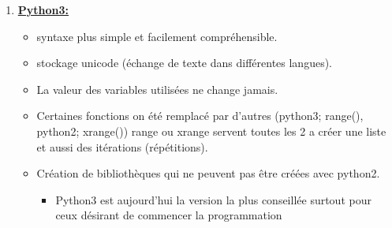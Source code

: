 \documentclass[a4paper, 12pt]{article}
\numberwithin{equation}{subsection}
\begin{document}
\begin{enumerate}
\begin{enumerate}
\begin{itemize}
              \end{itemize}
        \item \underline{{\bf Python3:}}
              \begin{itemize}
                \item syntaxe plus simple et facilement compréhensible.
                \item  stockage unicode (échange de texte dans différentes langues).
                \item La valeur des variables utilisées ne change jamais.
                \item Certaines fonctions on été remplacé par d’autres (python3; range(), python2; xrange()) range ou xrange servent toutes les 2 a créer une liste et aussi des itérations (répétitions).
                \item Création de bibliothèques qui ne peuvent pas être créées avec python2.
                      \begin{itemize}
                        \item Python3 est aujourd’hui la version la plus conseillée surtout pour ceux désirant de commencer la programmation
                      \end{itemize}
              \end{itemize}
      \end{enumerate}
\end{enumerate}
\end{document}
